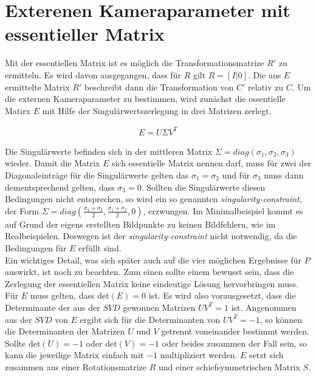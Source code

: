 \section{Exterenen Kameraparameter mit essentieller Matrix}


Mit der essentiellen Matrix ist es möglich die Transformationsmatrize $R'$ zu ermitteln. Es wird davon ausgegangen, dass für $R$ gilt $R = [I|0]$. Die aus $E$ ermittelte Matrix $R'$ beschreibt dann die Transformation von $C'$ relativ zu $C$\cite{HZ,Ferid}. Um die externen Kameraparameter zu bestimmen, wird zunächst die essentielle Matirx \ensuremath{E} mit Hilfe der Singulärwertszerlegung in drei Matrizen zerlegt. 

\begin{gather}
E = U\Sigma V^T
\end{gather}

Die Singulärwerte befinden sich in der mittleren Matrix $\Sigma = diag(\sigma_1,\sigma_2,\sigma_3)$ wieder. Damit die Matrix $E$ sich essentielle Matrix nennen darf, muss für zwei der Diagonaleinträge für die Singulärwerte gelten das $\sigma_1 = \sigma_2$ und für $\sigma_3$ muss dann dementsprechend gelten, dass $\sigma_3=0$. Sollten die Singulärwerte diesen Bedingungen nicht entsprechen, so wird ein so genannten \textit{singularity-constraint}, der Form $\Sigma = diag(\frac{\sigma_1+ \sigma_2}{2},\frac{\sigma_1+\sigma_2}{2},0)$, erzwungen\cite{HZ}. Im Minimalbeispiel kommt es auf Grund der eigens erstellten Bildpunkte zu keinen Bildfehlern, wie im Realbeispielen. Deswegen ist der \textit{singularity-constraint} nicht notwendig, da die Bedingungen für $E$ erfüllt sind.\\

Ein wichtiges Detail, was sich später auch auf die vier möglichen Ergebnisse für $P$ auswirkt, ist noch zu beachten. Zum einen sollte einem bewusst sein, dass die Zerlegung der essentiellen Matrix keine eindeutige Lösung hervorbringen muss. Für $E$ muss gelten, dass $\text{det}(E) = 0$ ist. Es wird also vorausgesetzt, dass die Determinante der aus der $SVD$ gewonnen Matrizen $UV^T = 1$ ist. Angenommen aus der $SVD$ von $E$ ergibt sich für die Determinanten von $UV^T = -1$, so können die Determinanten der Matrizen $U$ und $V$ getrennt voneinander bestimmt werden. Sollte $\text{det}(U)=-1$ oder $\text{det}(V)=-1$ oder beides zusammen der Fall sein, so kann die jeweilige Matrix einfach mit $-1$ multipliziert werden. $E$ setzt sich zusammen aus einer Rotationsmatrize $R$ und einer schiefsymmetrischen Matrix $S$.

